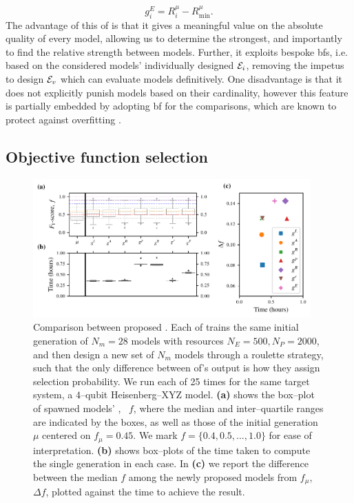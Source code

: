 \begin{equation}
    \label{eqn:elo_fitness}
    g_i^E = R_i^{\mu} - R_{\textrm{min}}^{\mu}.
\end{equation}
The advantage of this \gls{of} is that it gives a meaningful value on the absolute quality of every model, 
    allowing us to determine the strongest, and importantly to find the relative strength between models. 
Further, it exploits bespoke \glspl{bf}, i.e. based on the considered models' 
    individually designed ${ \mathcal{E} }_i$,
    removing the impetus to design ${ \mathcal{E} }_v$ which can
    evaluate models definitively. 
One disadvantage is that it does not explicitly punish models based 
    on their cardinality, 
    however this feature is partially embedded by adopting \gls{bf} for the comparisons, 
    which are known to protect against overfitting \cite{kass1995bayes}.

\subsection{Objective function selection}\label{sec:obj_fnc_selection}
\begin{figure}
    \centering
    \includegraphics[width=0.95\textwidth]{theoretical_study/figures/objective_fnc_comparison.pdf}
    \caption[Comparison between proposed ]{
        Comparison between proposed . 
        Each \gls{of} trains the same initial generation of $N_m=28$ models with resources
        $N_E=500, N_P=2000$, and then design a new set of $N_m$ models through 
        a roulette strategy, such that the only difference between \gls{of}'s output 
        is how they assign selection probability.
        We run each \gls{of} 25 times for the same target system, 
            a $4$--qubit Heisenberg--XYZ model. 
        \textbf{(a)} shows the box--plot of spawned models' \fs, \ $f$, 
            where the median and inter--quartile ranges are indicated by the boxes,
            as well as those of the initial generation $\mu$ centered on $f_{\mu}=0.45$.
            We mark $f=\{0.4, 0.5, ..., 1.0\}$ for ease of interpretation. 
        \textbf{(b)} shows box--plots of the time taken to compute the single generation in each case.
        In \textbf{(c)} we report the difference between the median $f$ among the 
            newly proposed models from $f_{\mu}$, $\Delta f$,
            plotted against the time to achieve the result. 
    }
    \label{fig:obj_fnc_comparison}
\end{figure}

